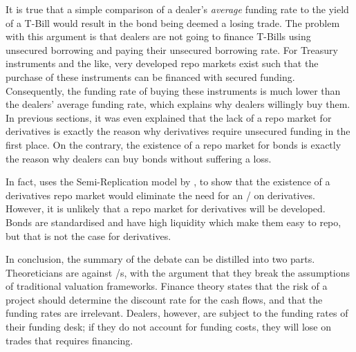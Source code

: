 \documentclass[main.tex]{subfiles}
\begin{document}
            It is true that a simple comparison of a dealer's \textit{average} funding rate
            to the yield of a T-Bill would result in the bond being deemed a losing trade.
            The problem with this argument is that dealers are not going to finance T-Bills
            using unsecured borrowing and paying their unsecured borrowing rate.
            For Treasury instruments and the like,
            very developed repo markets exist such that 
            the purchase of these instruments can be financed with secured funding.
            Consequently, the funding rate of buying these instruments is much lower 
            than the dealers' average funding rate,
            which explains why dealers willingly buy them.
            In previous sections, it was even explained that
            the lack of a repo market for derivatives is exactly the reason 
            why derivatives require unsecured funding in the first place.
            On the contrary, the existence of a repo market for bonds is exactly the reason
            why dealers can buy bonds without suffering a loss.

            In fact, \textcite{Green2015XVA}
            uses the Semi-Replication model by \textcite{BurgardKjaer2013Funding},
            to show that the existence of a derivatives repo market
            would eliminate the need for an \FVA/ on derivatives. 
            However, it is unlikely that a repo market for derivatives will be developed.
            Bonds are standardised and have high liquidity which make them easy to repo,
            but that is not the case for derivatives.

        In conclusion, the summary of the debate can be distilled into two parts.
        Theoreticians are against \FVA/s, 
        with the argument that they break the assumptions of traditional valuation frameworks.
        Finance theory states that the risk of a project 
        should determine the discount rate for the cash flows, 
        and that the funding rates are irrelevant.
        Dealers, however, are subject to the funding rates of their funding desk;
        if they do not account for funding costs, they will lose on trades that requires financing.
\end{document}
